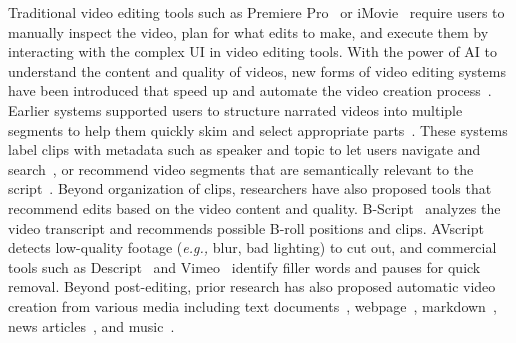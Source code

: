 Traditional video editing tools such as Premiere Pro~\cite{PremierePro} or iMovie~\cite{iMovie} require users to manually inspect the video, plan for what edits to make, and execute them by interacting with the complex UI in video editing tools. With the power of AI to understand the content and quality of videos, new forms of video editing systems have been introduced that speed up and automate the video creation process~\cite{invideo, opus, capcut, Descript}. 
Earlier systems supported users to structure narrated videos into multiple segments to help them quickly skim and select appropriate parts~\cite{truong2016quickcut, truong2019tool, wang2019write, leake2017computational, huh2023avscript}.
These systems label clips with metadata such as speaker and topic to let users navigate and search~\cite{truong2019tool, huh2023avscript}, or recommend video segments that are semantically relevant to the script~\cite{truong2016quickcut, wang2019write, xia2020crosscast, leake2020generating}.
Beyond organization of clips, researchers have also proposed tools that recommend edits based on the video content and quality. B-Script~\cite{huber2019b} analyzes the video transcript and recommends possible B-roll positions and clips. 
AVscript~\cite{huh2023avscript} detects low-quality footage (\textit{e.g.,} blur, bad lighting) to cut out, and commercial tools such as Descript~\cite{Descript} and Vimeo~\cite{Vimeo} identify filler words and pauses for quick removal. 
Beyond post-editing, prior research has also proposed automatic video creation from various media including text documents~\cite{chi2022synthesis}, webpage~\cite{chi2020automatic}, markdown~\cite{chi2021automatic}, news articles~\cite{wang2024reelframer}, and music~\cite{liu2023generative}. 

